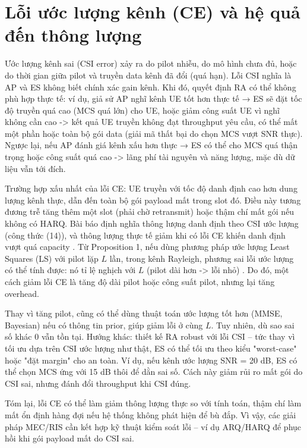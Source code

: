 \section{Lỗi ước lượng kênh (CE) và hệ quả đến thông lượng}

Ước lượng kênh sai (CSI error) xảy ra do pilot nhiễu, do mô hình chưa đủ, hoặc do thời gian giữa pilot và truyền data kênh đã đổi (quá hạn). Lỗi CSI nghĩa là AP và ES không biết chính xác gain kênh. Khi đó, quyết định RA có thể không phù hợp thực tế: ví dụ, giả sử AP nghĩ kênh UE tốt hơn thực tế → ES sẽ đặt tốc độ truyền quá cao (MCS quá lớn) cho UE, hoặc giảm công suất UE vì nghĩ không cần cao -> kết quả UE truyền không đạt throughput yêu cầu, có thể mất một phần hoặc toàn bộ gói data (giải mã thất bại do chọn MCS vượt SNR thực). Ngược lại, nếu AP đánh giá kênh xấu hơn thực → ES có thể cho MCS quá thận trọng hoặc công suất quá cao -> lãng phí tài nguyên và năng lượng, mặc dù dữ liệu vẫn tới đích.


Trường hợp xấu nhất của lỗi CE: UE truyền với tốc độ danh định cao hơn dung lượng kênh thực, dẫn đến toàn bộ gói payload mất trong slot đó. Điều này tương đương trễ tăng thêm một slot (phải chờ retransmit) hoặc thậm chí mất gói nếu không có HARQ. Bài báo định nghĩa thông lượng danh định theo CSI ước lượng (công thức (14)), và thông lượng thực tế giảm khi có lỗi CE khiến danh định vượt quá capacity . Từ Proposition 1, nếu dùng phương pháp ước lượng Least Squares (LS) với pilot lặp $L$ lần, trong kênh Rayleigh, phương sai lỗi ước lượng có thể tính được: nó tỉ lệ nghịch với $L$ (pilot dài hơn -> lỗi nhỏ)  . Do đó, một cách giảm lỗi CE là tăng độ dài pilot hoặc công suất pilot, nhưng lại tăng overhead.


Thay vì tăng pilot, cũng có thể dùng thuật toán ước lượng tốt hơn (MMSE, Bayesian) nếu có thông tin prior, giúp giảm lỗi ở cùng $L$. Tuy nhiên, dù sao sai số khác 0 vẫn tồn tại. Hướng khác: thiết kế RA robust với lỗi CSI – tức thay vì tối ưu dựa trên CSI ước lượng như thật, ES có thể tối ưu theo kiểu "worst-case" hoặc "đặt margin" cho an toàn. Ví dụ, nếu kênh ước lượng SNR = 20 dB, ES có thể chọn MCS ứng với 15 dB thôi để dằn sai số. Cách này giảm rủi ro mất gói do CSI sai, nhưng đánh đổi throughput khi CSI đúng.

Tóm lại, lỗi CE có thể làm giảm thông lượng thực so với tính toán, thậm chí làm mất ổn định hàng đợi nếu hệ thống không phát hiện để bù đắp. Vì vậy, các giải pháp MEC/RIS cần kết hợp kỹ thuật kiểm soát lỗi – ví dụ ARQ/HARQ để phục hồi khi gói payload mất do CSI sai.

